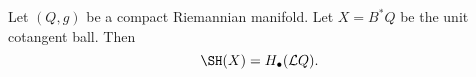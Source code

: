 
    Let $(Q, g)$ be a compact Riemannian manifold. Let $X=B^*Q$ be the unit cotangent ball. Then 
    \[\SH(X)= H_\bullet(\mathcal L Q).\]
    \label{thm:viterbosTheorem}
